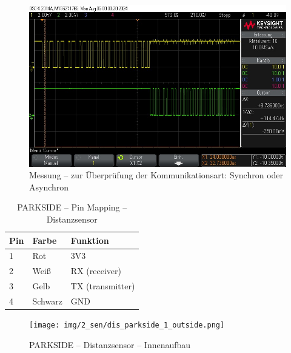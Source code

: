 \pagebreak[1]
\begin{figure}[!ht]
	\begin{center}
		\includegraphics[width=\textwidth]{img/2_sen/ozi_3.png}
		\caption{Messung – zur Überprüfung der Kommunikationsart: Synchron oder Asynchron}
		\label{parkside:ozi:datenübertragung}
	\end{center}
\end{figure}
\pagebreak[1]




\pagebreak[1]
\begin{table}[!ht]
	\centering
	\caption{PARKSIDE – Pin Mapping – Distanzsensor}
	\label{parkside:pinmapping}
	\begin{tabular}{l|ll}
		\hline
		\textbf{Pin} & \textbf{Farbe} & \textbf{Funktion} \\ \hline
		1            & Rot            & 3V3               \\
		2            & Weiß           & RX (receiver)     \\
		3            & Gelb           & TX (transmitter)  \\
		4            & Schwarz        & GND               \\ \hline
	\end{tabular}
\end{table}
\pagebreak[1]

\pagebreak[1]
\begin{figure}[!ht]
	\begin{center}
		\texttt{[image: img/2\_sen/dis\_parkside\_1\_outside.png]}
		\caption{PARKSIDE – Distanzsensor – Innenaufbau}
		\label{img_2_2:sen_dis_parkside:1}
	\end{center}
\end{figure}
\pagebreak[4]

